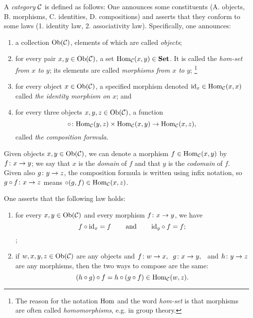 \begin{definition}\label{def:category}

A {\em category} $\mathcal{C}$ is defined as follows: One announces some constituents (A. objects, B. morphisms, C. identities, D. compositions) and asserts that they conform to some laws (1. identity law, 2. associativity law). Specifically, one announces:
\begin{enumerate}[\hsp A.]
\item a collection $\textnormal{Ob}(\mathcal{C})$, elements of which are called {\em objects};
\item for every pair $x,y\in\textnormal{Ob}(\mathcal{C})$, a set $\textnormal{Hom}_\mathcal{C}(x,y)\in{\bf Set}$. It is called the {\em hom-set from $x$ to $y$}; its elements are called {\em morphisms from $x$ to $y$};
\footnote{The reason for the notation $\textnormal{Hom}$ and the word {\em hom-set} is that morphisms are often called {\em homomorphisms}, e.g. in group theory.}
\item for every object $x\in\textnormal{Ob}(\mathcal{C})$, a specified morphism denoted $\textnormal{id}_x\in\textnormal{Hom}_\mathcal{C}(x,x)$ called {\em the identity morphism on $x$}; and
\item for every three objects $x,y,z\in\textnormal{Ob}(\mathcal{C})$, a function $$\circ\colon\textnormal{Hom}_\mathcal{C}(y,z)\times\textnormal{Hom}_\mathcal{C}(x,y)\rightarrow\textnormal{Hom}_\mathcal{C}(x,z),$$ called {\em the composition formula}.
\end{enumerate}
Given objects $x,y\in\textnormal{Ob}(\mathcal{C})$, we can denote a morphism $f\in\textnormal{Hom}_\mathcal{C}(x,y)$ by $f\colon x\rightarrow y$; we say that $x$ is the {\em domain} of $f$ and that $y$ is the {\em codomain} of $f$. Given also $g\colon y\rightarrow z$, the composition formula is written using infix notation, so $g\circ f\colon x\rightarrow z$ means $\circ(g,f)\in\textnormal{Hom}_\mathcal{C}(x,z)$.

One asserts that the following law holds:
\begin{enumerate}[\hsp 1.]
\item for every $x,y\in\textnormal{Ob}(\mathcal{C})$ and every morphism $f\colon x\rightarrow y$, we have
$$f\circ\textnormal{id}_x=f\hspace{.3in}\textnormal{and}\hspace{.3in}\textnormal{id}_y\circ f=f;$$ ;
\item if $w,x,y,z\in\textnormal{Ob}(\mathcal{C})$ are any objects and $f\colon w\rightarrow x,\;\;g\colon x\rightarrow y,\;\;$ and $h\colon y\rightarrow z$ are any morphisms, then the two ways to compose are the same:$$(h\circ g)\circ f = h\circ(g\circ f) \in\textnormal{Hom}_\mathcal{C}(w,z).$$
\end{enumerate}
\end{definition}


